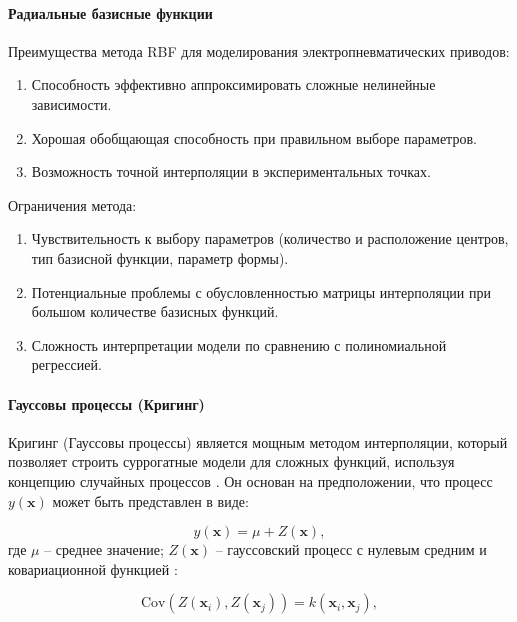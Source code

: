 \paragraph{Радиальные базисные функции}\label{sec:ch4/sec3/subsec1/subsubsec2}


Преимущества метода RBF для моделирования электропневматических приводов:

\begin{enumerate}
    \item Способность эффективно аппроксимировать сложные нелинейные зависимости.
    \item Хорошая обобщающая способность при правильном выборе параметров.
    \item Возможность точной интерполяции в экспериментальных точках.
\end{enumerate}

Ограничения метода:

\begin{enumerate}
    \item Чувствительность к выбору параметров (количество и расположение центров, тип базисной функции, параметр формы).
    \item Потенциальные проблемы с обусловленностью матрицы интерполяции при большом количестве базисных функций.
    \item Сложность интерпретации модели по сравнению с полиномиальной регрессией.
\end{enumerate}

\paragraph{Гауссовы процессы (Кригинг)}\label{sec:ch4/sec3/subsec1/subsubsec3}

Кригинг (Гауссовы процессы) является мощным методом интерполяции,
который позволяет строить суррогатные модели для сложных функций,
используя концепцию случайных процессов \cite{gramacy2020surrogates}. Он основан
на предположении, что процесс \( y(\mathbf{x}) \) может быть представлен в виде:

\begin{equation*}
    y(\mathbf{x}) = \mu + Z(\mathbf{x}),
\end{equation*}
где $\mu$ -- среднее значение; $Z(\mathbf{x})$ -- гауссовский процесс с нулевым средним и
ковариационной функцией \cite{marrel2024probabilistic}:

\begin{equation*}
    \text{Cov}(Z(\mathbf{x}_i), Z(\mathbf{x}_j)) = k(\mathbf{x}_i, \mathbf{x}_j),
\end{equation*}

